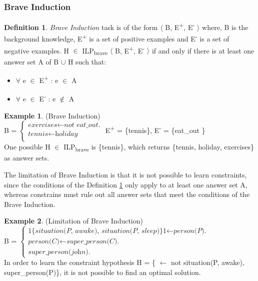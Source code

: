 \documentclass[11pt,twoside]{report}
\theoremstyle{plain}
\theoremstyle{definition}
\newtheorem{defn}[thm]{Definition} %
\newtheorem{examp}{Example}[section]
\begin{document}
\subsubsection{Brave Induction}
\begin{defn} \label{def:brave_induction}
\textit{Brave Induction} task is of the form $\langle$ B, E\textsuperscript{+}, E\textsuperscript{-} $\rangle$ where, B is the background knowledge, E\textsuperscript{+} is a set of positive examples and E\textsuperscript{-} is a set of negative examples.
 H $\in$ ILP\textsubscript{brave} $\langle$ B, E\textsuperscript{+}, E\textsuperscript{-} $\rangle$ if and only if there is at least one answer set A of B $\cup$ H such that: \\
\begin{itemize}
\item $\forall$ e $\in$ E\textsuperscript{+} : e $\in$ A \\
\item $\forall$ e $\in$ E\textsuperscript{-} : e $\notin$ A \\
\end{itemize}
\end{defn}

\begin{examp} \normalfont (Brave Induction) \\

B = $\begin{cases}
	\textit{exercises}  \leftarrow \textit{not \ eat\_out.} \\
	\textit{tennis} \leftarrow \textit{holiday} \\
      \end{cases}$
E\textsuperscript{+} = \{tennis\},   E\textsuperscript{-} = \{eat\_out \} \\

One possible  H $\in$ ILP\textsubscript{brave} is \{tennis\}, which returns \{tennis, holiday, exercises\} as answer sets.
\end{examp}
\label{brave_induction_example}

The limitation of Brave Induction is that it is not possible to learn constraints, since the conditions of the Definition \ref{def:brave_induction} only apply to at least one answer set A, 
whereas constrains must rule out all answer sets that meet  the conditions of the Brave Induction.

\begin{examp} \normalfont (Limitation of Brave Induction) \\

B = $\begin{cases}
	\textit{1\{situation(P, awake), situation(P, sleep)\}1} \leftarrow \textit{person(P).} \\
	\textit{person(C)} \leftarrow \textit{super\_person(C).} \\
	\textit{super\_person(john).}
	\end{cases}$ \\

In order to learn the  constraint hypothesis H = \{ $\leftarrow$ not situation(P, awake), super\_person(P)\}, it is not possible to find an optimal solution.
\end{examp}
\label{limitation_brave}
\end{document}
